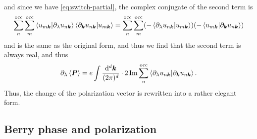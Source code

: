 \documentclass[hyperref, a4paper]{article}
\begin{document}
and since we have \eqref{eq:switch-partial}, the complex conjugate of the second term is 
\[
    \sum_{n}^{\text{occ}} \sum_{m}^{\text{occ}}
    \braket{u_{m \vb*{k}}}{\partial_{\lambda} u_{n \vb*{k}}}
    \braket{\partial_{\vb*{k}} u_{n \vb*{k}}}{u_{m \vb*{k}}}
    = \sum_{n}^{\text{occ}} \sum_{m}^{\text{occ}}
    (- \braket{\partial_{\lambda} u_{n \vb*{k}}}{u_{m \vb*{k}}})
    (- \braket{u_{m \vb*{k}}}{\partial_{\vb*{k}} u_{n \vb*{k}}})
\]
and is the same as the original form, 
and thus we find that the second term is always real, 
and thus 
\begin{equation}
    \partial_{\lambda} \expval{\vb*{P}} = e \int \frac{\dd[d]{\vb*{k}}}{(2\pi)^d} 
    \cdot 2 \Im \sum_{n}^{\text{occ}} 
    \braket{\partial_\lambda u_{n \vb*{k}}}{\partial_{\vb*{k}} u_{n \vb*{k}}}.
    \label{eq:change-of-p-3}
\end{equation}
Thus, the change of the polarization vector 
is rewritten into a rather elegant form.

\subsection{Berry phase and polarization}
\end{document}
